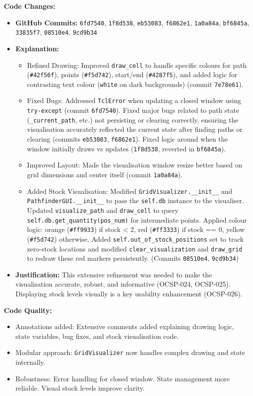 \textbf{Code Changes:}
\begin{itemize}
	\item \textbf{GitHub Commits:} \verb|6fd7540|, \verb|1f8d538|, \verb|eb53083|, \verb|f6862e1|, \verb|1a0a84a|, \verb|bf6845a|, \verb|33835f7|, \verb|08510e4|, \verb|9cd9b34|
	\item \textbf{Explanation:}
	\begin{itemize}
		\item Refined Drawing: Improved \verb|draw_cell| to handle specific colours for path (\verb|#42f56f|), points (\verb|#f5d742|), start/end (\verb|#4287f5|), and added logic for contrasting text colour (\verb|white| on dark backgrounds) (commit \verb|7e78e61|).
		\item Fixed Bugs: Addressed \verb|TclError| when updating a closed window using \verb|try-except| (commit \verb|6fd7540|). Fixed major bugs related to path state (\verb|_current_path|, etc.) not persisting or clearing correctly, ensuring the visualisation accurately reflected the current state after finding paths or clearing (commits \verb|eb53083|, \verb|f6862e1|). Fixed logic around when the window initially draws vs updates (\verb|1f8d538|, reverted in \verb|bf6845a|).
		\item Improved Layout: Made the visualisation window resize better based on grid dimensions and center itself (commit \verb|1a0a84a|).
		\item Added Stock Visualisation: Modified \verb|GridVisualizer.__init__| and \verb|PathfinderGUI.__init__| to pass the \verb|self.db| instance to the visualiser. Updated \verb|visualize_path| and \verb|draw_cell| to query \verb|self.db.get_quantity(pos_num)| for intermediate points. Applied colour logic: orange (\verb|#ff9933|) if stock < 2, red (\verb|#ff3333|) if stock == 0, yellow (\verb|#f5d742|) otherwise. Added \verb|self.out_of_stock_positions| set to track zero-stock locations and modified \verb|clear_visualization| and \verb|draw_grid| to redraw these red markers persistently. (Commits \verb|08510e4|, \verb|9cd9b34|)
	\end{itemize}
	\item \textbf{Justification:} This extensive refinement was needed to make the visualisation accurate, robust, and informative (OCSP-024, OCSP-025). Displaying stock levels visually is a key usability enhancement (OCSP-026).
\end{itemize}

\textbf{Code Quality:}
\begin{itemize}
	\item Annotations added: Extensive comments added explaining drawing logic, state variables, bug fixes, and stock visualisation code.
	\item Modular approach: \verb|GridVisualizer| now handles complex drawing and state internally.
	\item Robustness: Error handling for closed window. State management more reliable. Visual stock levels improve clarity.
\end{itemize}

